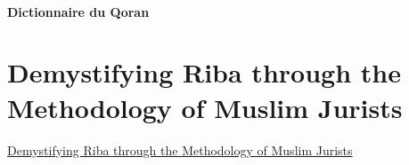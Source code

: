  
 \paragraph{Dictionnaire du Qoran}
 

 \section{Demystifying Riba through the Methodology of Muslim Jurists}
 \href{https://www.proquest.com/docview/2352353188?accountid=143046&parentSessionId=Sg7rHgjzHS0M9aF4pv1Nx2pxOOyR5LkKvILKrOVqG1o\%3D&pq-origsite=summon}{Demystifying Riba through the Methodology of Muslim Jurists}
 \cite{Siddique:DemystifyingRiba}



